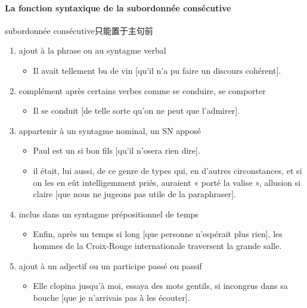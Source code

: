 \documentclass[UTF8]{report}
\begin{document}
\paragraph{La fonction syntaxique de la subordonnée consécutive}
subordonnée consécutive只能置于主句前
\begin{enumerate}
    \item ajout à la phrase ou au syntagme verbal
    \begin{itemize}
        \item Il avait tellement bu de vin [qu’il n’a pu faire un discours cohérent].
    \end{itemize}
    \item complément après certains verbes comme se conduire, se comporter
    \begin{itemize}
        \item Il se conduit [de telle sorte qu’on ne peut que l’admirer].
    \end{itemize}
    \item appartenir à un syntagme nominal, un SN apposé
    \begin{itemize}
        \item Paul est un si bon fils [qu’il n’osera rien dire].
        \item il était, lui aussi, de ce genre de types qui, en d’autres circonstances, et si on les en eût intelligemment priés, auraient « porté la valise », allusion si claire [que nous ne jugeons pas utile de la paraphraser].
    \end{itemize}
    \item inclus dans un syntagme prépositionnel de temps
    \begin{itemize}
        \item Enfin, après un temps si long [que personne n’espérait plus rien], les hommes de la Croix-Rouge internationale traversent la grande salle.
    \end{itemize}
    \item ajout à un adjectif ou un participe passé ou passif
    \begin{itemize}
        \item Elle clopina jusqu’à moi, essaya des mots gentils, si incongrus dans sa bouche [que je n’arrivais pas à les écouter].
    \end{itemize}
\end{enumerate}
\end{document}
